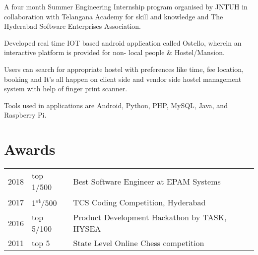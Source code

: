 \documentclass[]{kk-resume-openfont}
\begin{document}
\begin{minipage}[t]{0.66\textwidth}
\begin{tightemize}
\item A four month Summer Engineering Internship program organised by JNTUH in collaboration with Telangana Academy
for skill and knowledge and The Hyderabad Software Enterprises Association.
\item Developed real time IOT based android application called Ostello, wherein an interactive platform is provided for non-
local people \& Hostel/Mansion.
\item Users can search for appropriate hostel with preferences like time, fee location, booking and It’s all happen on client side and vendor side hostel management system with help of finger print scanner.
\item Tools used in applications are Android, Python, PHP, MySQL, Java, and Raspberry Pi.
\end{tightemize}
\sectionsep


\section{Awards} 
\begin{tabular}{rll}
2018	     & top 1/500  & Best Software Engineer at EPAM Systems\\
2017	     & 1\textsuperscript{st}/500  & TCS Coding Competition, Hyderabad\\ 
2016	     & top 5/100  & Product Development Hackathon by TASK, HYSEA \\
2011     & top 5 & State Level Online Chess competition \\
\end{tabular}
\sectionsep
\end{minipage} 
\end{document}
